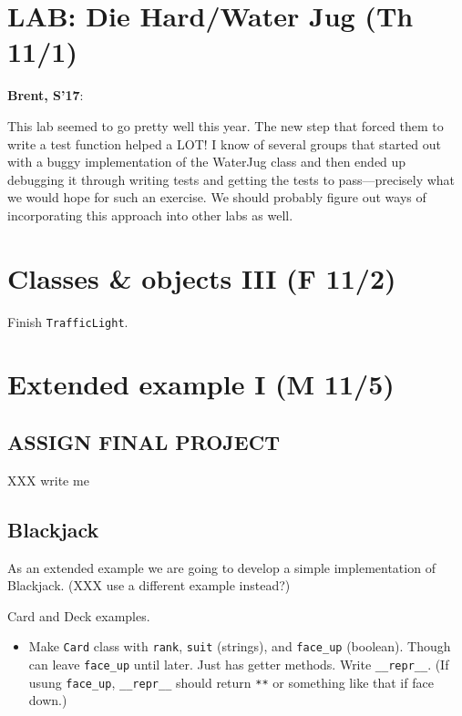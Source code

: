 \documentclass{article}
\newenvironment{reflect}[1]
{
  \noindent
  \begin{lrbox}{\reflectbox}
    \begin{minipage}[t]{\textwidth}
      \textbf{#1}:
}{
    \end{minipage}
  \end{lrbox}
  \fbox{\usebox{\reflectbox}}
}
\begin{document}
\newpage
\section*{LAB: Die Hard/Water Jug (Th 11/1)}

\begin{reflect}{Brent, S'17}
  This lab seemed to go pretty well this year.  The new step that
  forced them to write a test function helped a LOT!  I know of
  several groups that started out with a buggy implementation of the
  WaterJug class and then ended up debugging it through writing tests
  and getting the tests to pass---precisely what we would hope for
  such an exercise.  We should probably figure out ways of
  incorporating this approach into other labs as well.
\end{reflect}

\newpage
\section{Classes \& objects III (F 11/2)}

Finish \verb|TrafficLight|.


\newpage
\section{Extended example I (M 11/5)}

\subsection*{ASSIGN FINAL PROJECT}

XXX write me

\subsection*{Blackjack}

As an extended example we are going to develop a simple implementation
of Blackjack.  (XXX use a different example instead?)

Card and Deck examples.
\begin{itemize}
\item Make \verb|Card| class with \verb|rank|, \verb|suit| (strings),
  and \verb|face_up| (boolean).  Though can leave \verb|face_up| until
  later.  Just has getter methods.  Write \verb|__repr__|. (If usung
  \verb|face_up|, \verb|__repr__| should return \verb|**| or something
  like that if face down.)
\end{itemize}
\end{document}
